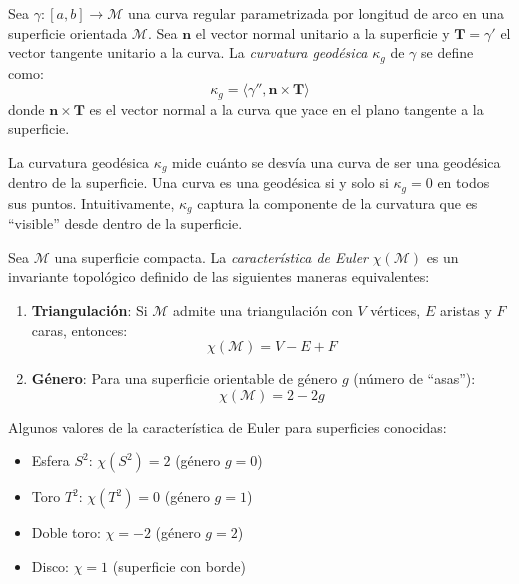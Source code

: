 \begin{definition}\label{def:curvatura_geodesica}
Sea $\gamma: [a,b] \to \mathcal{M}$ una curva regular parametrizada por longitud  de arco en una superficie orientada $\mathcal{M}$. Sea $\mathbf{n}$ el vector  normal unitario a la superficie y $\mathbf{T} = \gamma'$ el vector tangente  unitario a la curva. La \textit{curvatura geodésica} $\kappa_g$ de $\gamma$ se define como:
\begin{equation}\label{eq:curvatura_geodesica}
\kappa_g = \langle \gamma'', \mathbf{n} \times \mathbf{T} \rangle
\end{equation}
donde $\mathbf{n} \times \mathbf{T}$ es el vector normal a la curva que yace en el plano tangente a la superficie.
\end{definition}

\begin{remark}
La curvatura geodésica $\kappa_g$ mide cuánto se desvía una curva de ser una geodésica dentro de la superficie. Una curva es una geodésica si y solo si $\kappa_g = 0$ en todos sus puntos. Intuitivamente, $\kappa_g$ captura la componente de la curvatura que es ``visible'' desde dentro de la superficie.
\end{remark}

\begin{definition}\label{def:caracteristica_euler}
Sea $\mathcal{M}$ una superficie compacta. La \textit{característica de Euler} $\chi(\mathcal{M})$ es un invariante topológico definido de las siguientes maneras equivalentes:
\begin{enumerate}
    \item \textbf{Triangulación}: Si $\mathcal{M}$ admite una triangulación con $V$ vértices, $E$ aristas y $F$ caras, entonces:
          \begin{equation}\label{eq:euler_triangulacion}
          \chi(\mathcal{M}) = V - E + F
          \end{equation}

    \item \textbf{Género}: Para una superficie orientable de género $g$ (número de ``asas''):
          \begin{equation}\label{eq:euler_genero}
          \chi(\mathcal{M}) = 2 - 2g
          \end{equation}
\end{enumerate}
\end{definition}

\begin{example}\label{ex:euler_superficies}
Algunos valores de la característica de Euler para superficies conocidas:
\begin{itemize}
    \item Esfera $S^2$: $\chi(S^2) = 2$ (género $g = 0$)
    \item Toro $T^2$: $\chi(T^2) = 0$ (género $g = 1$)
    \item Doble toro: $\chi = -2$ (género $g = 2$)
    \item Disco: $\chi = 1$ (superficie con borde)
\end{itemize}
\end{example}

